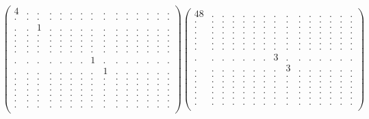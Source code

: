 \documentclass[12pt,a4paper]{amsart}
\begin{document}
\begin{align*}
\left(\begin{array}{rrrrrrrrrrrrrrr}%
4&.&.&.&.&.&.&.&.&.&.&.&.&.&.\\%
.&.&.&.&.&.&.&.&.&.&.&.&.&.&.\\%
.&.&1&.&.&.&.&.&.&.&.&.&.&.&.\\%
.&.&.&.&.&.&.&.&.&.&.&.&.&.&.\\%
.&.&.&.&.&.&.&.&.&.&.&.&.&.&.\\%
.&.&.&.&.&.&.&.&.&.&.&.&.&.&.\\%
.&.&.&.&.&.&.&.&.&.&.&.&.&.&.\\%
.&.&.&.&.&.&.&1&.&.&.&.&.&.&.\\%
.&.&.&.&.&.&.&.&1&.&.&.&.&.&.\\%
.&.&.&.&.&.&.&.&.&.&.&.&.&.&.\\%
.&.&.&.&.&.&.&.&.&.&.&.&.&.&.\\%
.&.&.&.&.&.&.&.&.&.&.&.&.&.&.\\%
.&.&.&.&.&.&.&.&.&.&.&.&.&.&.\\%
.&.&.&.&.&.&.&.&.&.&.&.&.&.&.\\%
.&.&.&.&.&.&.&.&.&.&.&.&.&.&.\\%
\end{array}\right)%
\left(\begin{array}{rrrrrrrrrrrrrrr}%
48&.&.&.&.&.&.&.&.&.&.&.&.&.&.\\%
.&.&.&.&.&.&.&.&.&.&.&.&.&.&.\\%
.&.&.&.&.&.&.&.&.&.&.&.&.&.&.\\%
.&.&.&.&.&.&.&.&.&.&.&.&.&.&.\\%
.&.&.&.&.&.&.&.&.&.&.&.&.&.&.\\%
.&.&.&.&.&.&.&.&.&.&.&.&.&.&.\\%
.&.&.&.&.&.&.&.&.&.&.&.&.&.&.\\%
.&.&.&.&.&.&.&3&.&.&.&.&.&.&.\\%
.&.&.&.&.&.&.&.&3&.&.&.&.&.&.\\%
.&.&.&.&.&.&.&.&.&.&.&.&.&.&.\\%
.&.&.&.&.&.&.&.&.&.&.&.&.&.&.\\%
.&.&.&.&.&.&.&.&.&.&.&.&.&.&.\\%
.&.&.&.&.&.&.&.&.&.&.&.&.&.&.\\%
.&.&.&.&.&.&.&.&.&.&.&.&.&.&.\\%
.&.&.&.&.&.&.&.&.&.&.&.&.&.&.\\%
\end{array}\right)%
\end{align*}
\end{document}
